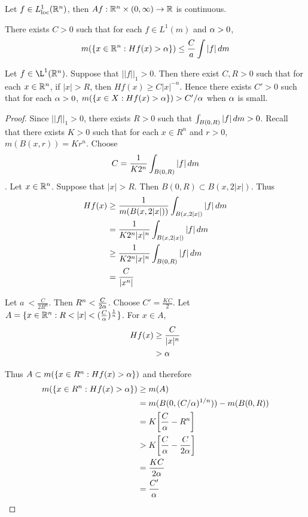 \documentclass{book}
\begin{document}
	\begin{lem}
		Let $f \in L^1_{\text{loc}}(\mathbb{R}^n)$, then $Af:\mathbb{R}^n \times (0, \infty)\rightarrow \mathbb{R}$ is continuous.
	\end{lem}
	
	\begin{thm}
		There exists $C >0$ such that for each $f \in L^1(m)$ and $\alpha > 0$, $$m(\{x \in \mathbb{R}^n: Hf(x) > \alpha\}) \leq \frac{C}{a} \int |f|\, d m$$
	\end{thm}
	
	\begin{ex}  
		Let $f \in \L^1(\R^n)$. Suppose that $||f||_1>0$. Then there exist $C,R>0$ such that for each $x \in \mathbb{R}^n$, if $|x| > R$, then $Hf(x) \geq C|x|^{-n}$. Hence there exists $C' > 0$ such that for each $\alpha >0$, $m(\{x \in X: Hf(x)>\alpha\}) > C'/\alpha$ when $\alpha$ is small. 
	\end{ex}
	
	\begin{proof}
		Since $||f||_1 >0$, there exists $R>0$ such that $\int_{B(0,R)}|f|\, d m >0$. Recall that there exists $K>0$ such that for each $x \in R^n$ and $r>0$, $m(B(x,r)) = Kr^n$. Choose $$C = \frac{1}{K2^n}\int_{B(0,R)}|f| \, d m$$. Let $x \in \mathbb{R}^n$. Suppose that $|x|>R$. Then $B(0,R) \subset B(x,2|x|)$. Thus 
		\begin{align*}
			Hf(x) 
			&\geq \frac{1}{m(B(x,2|x|))}\int_{B(x,2|x|)}|f|\, d m\\
			&= \frac{1}{K2^n|x|^n}\int_{B(x,2|x|)}|f|\, d m \\
			&\geq \frac{1}{K2^n|x|^n}\int_{B(0,R)}|f|\, d m \\
			&= \frac{C}{|x^n|}
		\end{align*}
		
		Let $a\ < \frac{C}{2R^n}$. Then $R^n < \frac{C}{2 \alpha}$. Choose $C' =\frac{KC}{2}$. Let $A = \{x \in \mathbb{R}^n: R < |x|< (\frac{C}{\alpha})^{\frac{1}{n}}\}$. For $x \in A$, 
		\begin{align*}
			Hf(x) 
			&\geq \frac{C}{|x|^n} \\
			& > \alpha
		\end{align*}
		
		Thus $A \subset m(\{x \in R^n: Hf(x)> \alpha\})$ and therefore 
		\begin{align*}
			m(\{x \in R^n: Hf(x)> \alpha\}) 
			&\geq m(A) \\
			&= m(B(0,(C/\alpha)^{1/n})) - m(B(0,R)) \\
			&= K\bigg [\frac{C}{\alpha} - R^n \bigg] \\
			&> K\bigg[\frac{C}{\alpha} - \frac{C}{2 \alpha}\bigg] \\
			&= \frac{KC}{2 \alpha}\\
			&= \frac{C'}{\alpha}
		\end{align*}
	\end{proof}
	
\end{document}
